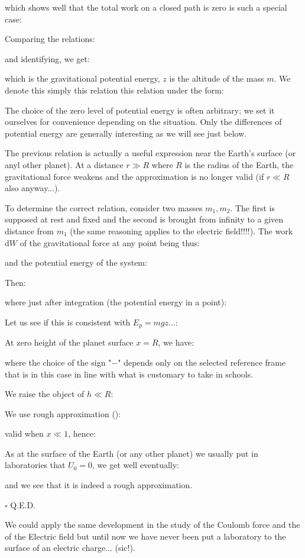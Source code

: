 	which shows well that the total work on a closed path is zero is such a special case:
	
	Comparing the relations:
	
	and identifying, we get:
	
	which is the gravitational potential energy, $z$ is the altitude of the mass $m$. We denote this simply this relation this relation under the form:
	
	\begin{tcolorbox}[title=Remark,colframe=black,arc=10pt]
	The choice of the zero level of potential energy is often arbitrary; we set it ourselves for convenience depending on the situation. Only the differences of potential energy are generally interesting as we will see just below.
	\end{tcolorbox}
	The previous relation is actually a useful expression near the Earth's surface (or anyl other planet). At a distance $r\gg R$ where $R$ is the radius of the Earth, the gravitational force weakens and the approximation is no longer valid (if $r\ll R$ also anyway...).
	
	To determine the correct relation, consider two masses $m_1,m_2$. The first is supposed at rest and fixed and the second is brought from infinity to a given distance from $m_1$ (the same reasoning applies to the electric field!!!!). The work $\mathrm{d}W$ of the gravitational force at any point being thus:
	
	and the potential energy of the system:
	
	Then:
	
	where just after integration (the potential energy in a point):
	
	Let us see if this is consistent with $E_p=mgz$...:
	\begin{dem}
	At zero height of the planet surface $x=R$, we have:
	
	where the choice of the sign "$-$" depends only on the selected reference frame that is in this case in line with what is customary to take in schools.

	We raise the object of $h\ll R$:
	
	We use rough approximation ():
	
	valid when $x\ll 1$, hence:
	
	As at the surface of the Earth (or any other planet) we usually put in laboratories that $U_0=0$, we get well eventually:
	
	and we see that it is indeed a rough approximation.
	\begin{flushright}
		$\square$  Q.E.D.
	\end{flushright}
	\end{dem}
	\begin{tcolorbox}[title=Remark,colframe=black,arc=10pt]
	We could apply the same development in the study of the Coulomb force and the of the Electric field but until now we have never been put a laboratory to the surface of an electric charge... (sic!).
	\end{tcolorbox}
	
